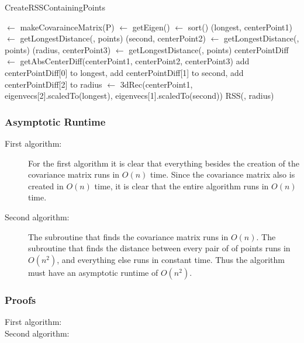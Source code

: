 \begin{algorithm}[H]
  \caption{CreateRSSContainingPoints}
   
  \dontprintsemicolon
  \covar $\gets$ makeCovarainceMatrix(P)\;
  \eigen $\gets$ getEigen(\covar) \;
  \eigen $\gets$ sort(\eigen) \;
  (longest, centerPoint1) $\gets$ getLongestDistance(\eigen[2], points) \;
  (second, centerPoint2) $\gets$ getLongestDistance(\eigen[1], points) \;
  (radius, centerPoint3) $\gets$ getLongestDistance(\eigen[0], points) \;
  centerPointDiff $\gets$ getAbsCenterDiff(centerPoint1, centerPoint2, centerPoint3) \;
  add centerPointDiff[0] to longest, add centerPointDiff[1] to second, add centerPointDiff[2] to radius \;
  \threedeeRec $\gets$ 3dRec(centerPoint1, eigenvecs[2].scaledTo(longest), eigenvecs[1].scaledTo(second)) \;
  \return RSS(\threedeeRec, radius) \;
\end{algorithm}

\subsubsection{Asymptotic Runtime}
\begin{description}
\item[First algorithm:] For the first algorithm it is clear that everything besides the creation of the covariance matrix runs in $O(n)$ time. Since the covariance matrix also is created in $O(n)$ time, it is clear that the entire algorithm runs in $O(n)$ time.

\item[Second algorithm:] The subroutine that finds the covariance matrix runs in $O(n)$. The subroutine that finds the distance between every pair of of points runs in $O(n^2)$, and everything else runs in constant time. Thus the algorithm must have an asymptotic runtime of $O(n^2)$.  
\end{description}

\subsubsection{Proofs}
\begin{description}
\item[First algorithm:]

\item[Second algorithm:]
\end{description}


